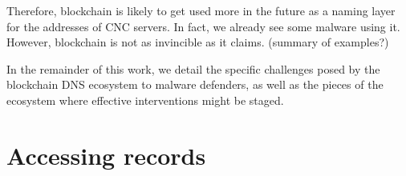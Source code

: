 \documentclass[10pt,sigconf,letterpaper]{acmart}
\begin{document}
Therefore, blockchain is likely to get used more in the future as a naming 
layer for the addresses of CNC servers. In fact, we already see some malware 
using it. However, blockchain is not as invincible as it claims. (summary of 
examples?)

In the remainder of this work, we detail the specific 
challenges posed by the blockchain DNS ecosystem to malware 
defenders, as well as the pieces of the ecosystem where 
effective interventions might be staged.






\section{Accessing records}
\end{document}
